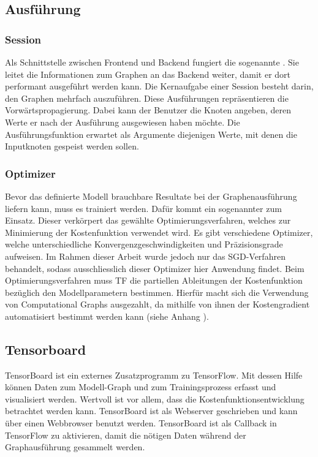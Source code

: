 \subsection{Ausführung}
\subsubsection{Session}
Als Schnittstelle zwischen Frontend und Backend fungiert die sogenannte
. Sie leitet die Informationen zum Graphen an das Backend weiter, damit er
dort performant ausgeführt werden kann.
Die Kernaufgabe einer Session besteht darin, den Graphen mehrfach auszuführen.
Diese Ausführungen repräsentieren die Vorwärtspropagierung.
Dabei kann der Benutzer die Knoten angeben, deren Werte er nach der
Ausführung ausgewiesen haben möchte. Die Ausführungsfunktion erwartet als Argumente
diejenigen Werte, mit denen die Inputknoten gespeist werden sollen.


\subsubsection{Optimizer}
Bevor das definierte Modell brauchbare Resultate bei der Graphenausführung
liefern kann,
muss es trainiert werden. Dafür kommt ein sogenannter  zum Einsatz.
Dieser verkörpert das gewählte Optimierungsverfahren, welches zur Minimierung
der Kostenfunktion verwendet wird.
Es gibt verschiedene Optimizer, welche unterschiedliche
Konvergenzgeschwindigkeiten und Präzisionsgrade aufweisen.
Im Rahmen dieser Arbeit wurde jedoch nur das SGD-Verfahren behandelt, sodass
ausschliesslich dieser Optimizer hier Anwendung findet.
\para{}
Beim Optimierungsverfahren muss TF die partiellen Ableitungen der Kostenfunktion
bezüglich den Modellparametern bestimmen. Hierfür macht sich die Verwendung von
Computational Graphs ausgezahlt, da mithilfe von ihnen der Kostengradient
automatisiert bestimmt werden kann (siehe Anhang ).

\subsection{Tensorboard}
TensorBoard ist ein externes Zusatzprogramm zu TensorFlow. Mit dessen Hilfe können
Daten zum Modell-Graph und zum Trainingsprozess erfasst und visualisiert werden.
Wertvoll ist vor allem, dass die Kostenfunktionsentwicklung betrachtet werden
kann.
\para{}
TensorBoard ist als Webserver geschrieben und kann über einen Webbrowser
benutzt werden.
TensorBoard ist als Callback in TensorFlow zu aktivieren, damit die
nötigen Daten während der Graphausführung gesammelt werden.

